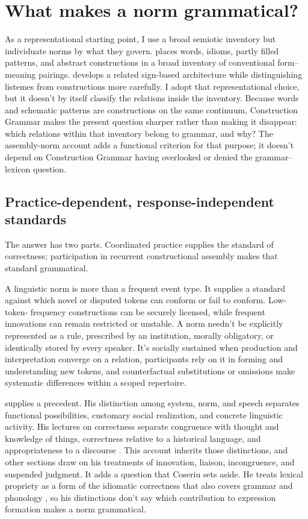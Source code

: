 \documentclass[12pt,letterpaper]{article}
\begin{document}
\section{What makes a norm grammatical?}
\label{sec:norms}

As a representational starting point, I use a broad semiotic inventory but
individuate norms by what they govern. \textcite[1--7]{goldberg1995constructions}
places words, idioms, partly filled patterns, and abstract constructions in a broad
inventory of conventional form--meaning pairings. \textcite[69--71,
104--106]{sag2012sign} develops a related sign-based architecture while
distinguishing listemes from constructions more carefully. I adopt that
representational choice, but it doesn't by
itself classify the relations inside the inventory. Because words and schematic
patterns are constructions on the same continuum, Construction Grammar makes the
present question sharper rather than making it disappear: which relations within
that inventory belong to grammar, and why? The assembly-norm account adds a functional
criterion for that purpose; it doesn't depend on Construction Grammar having
overlooked or denied the grammar--lexicon question.

\subsection{Practice-dependent, response-independent standards}
\label{sec:practice}

The answer has two parts. Coordinated practice supplies the standard of
correctness; participation in recurrent constructional assembly makes that
standard grammatical.

A linguistic norm is more than a frequent event type. It supplies a standard
against which novel or disputed tokens can conform or fail to conform. Low-token-
frequency constructions can be securely licensed, while frequent innovations can
remain restricted or unstable. A norm needn't be explicitly represented as a
rule, prescribed by an institution, morally obligatory, or identically stored by
every speaker. It's socially sustained when production and interpretation
converge on a relation, participants rely on it in forming and understanding new
tokens, and counterfactual substitutions or omissions make systematic differences
within a scoped repertoire.

\textcite[166--168]{coseriu1952} supplies a precedent. His distinction among
system, norm, and speech separates functional possibilities, customary social
realization, and concrete linguistic activity. His lectures on correctness
separate congruence with thought and knowledge of things, correctness relative to
a historical language, and appropriateness to a discourse
\citep[32--39, 60--61]{coseriu2019}. This account inherits those distinctions,
and other sections draw on his treatments of innovation, liaison, incongruence,
and suspended judgment. It adds a question that Coseriu sets aside. He treats
lexical propriety as a form of the idiomatic correctness that also covers grammar
and phonology \citep[39]{coseriu2019}, so his distinctions don't say which
contribution to expression formation makes a norm grammatical.
\end{document}

